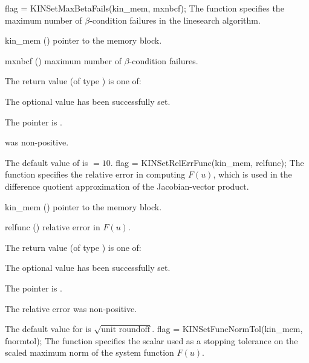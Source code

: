{
flag = KINSetMaxBetaFails(kin\_mem, mxnbcf);
}
{
  The function  specifies the maximum number of
  $\beta$-condition failures in the linesearch algorithm.
}
{
  \begin{args}
  \item[kin\_mem] ()
    pointer to the {\kinsol} memory block.
  \item[mxnbcf] ()
    maximum number of $\beta$-condition failures.
  \end{args}
}
{
  The return value  (of type ) is one of:
  \begin{args}
  \item[\Id{KIN\_SUCCESS}] 
    The optional value has been successfully set.
  \item[\Id{KIN\_MEM\_NULL}]
    The  pointer is .
  \item[\Id{KIN\_ILL\_INPUT}]
     was non-positive.
  \end{args}
}
{
  The default value of  is  $=10$.
}
{
flag = KINSetRelErrFunc(kin\_mem, relfunc);
}
{
  The function  specifies the relative error in 
  computing $F(u)$, which is used in the difference quotient approximation of the
  Jacobian-vector product.
}
{
  \begin{args}[relfunc]
  \item[kin\_mem] ()
    pointer to the {\kinsol} memory block.
  \item[relfunc] ()
    relative error in $F(u)$.
  \end{args}
}
{
  The return value  (of type ) is one of:
  \begin{args}
  \item[\Id{KIN\_SUCCESS}] 
    The optional value has been successfully set.
  \item[\Id{KIN\_MEM\_NULL}]
    The  pointer is .
  \item[\Id{KIN\_ILL\_INPUT}]
    The relative error was non-positive.
  \end{args}
}
{
  The default value for  is $\sqrt{\text{unit roundoff}}$.
}
{
flag = KINSetFuncNormTol(kin\_mem, fnormtol);
}
{
  The function  specifies the scalar used as a stopping
  tolerance on the scaled maximum norm of the system function $F(u)$.
}
